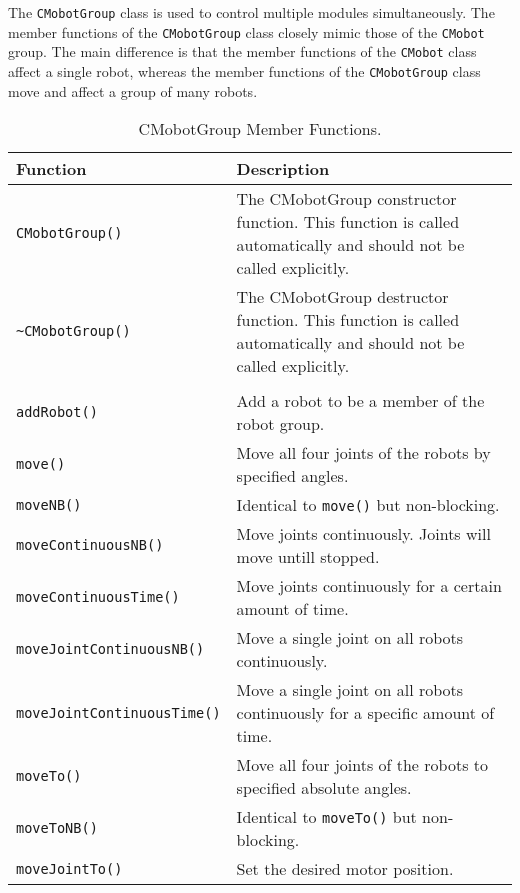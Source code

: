 The \texttt{CMobotGroup} class is used to control multiple modules simultaneously. The
member functions of the \texttt{CMobotGroup} class closely mimic those of the \texttt{CMobot}
group. The main difference is that the member functions of the \texttt{CMobot} class
affect a single robot, whereas the member functions of the \texttt{CMobotGroup} class
move and affect a group of many robots. 

\begin{table}[!h]
\begin{center}
\caption{CMobotGroup Member Functions.}
\begin{tabular}{p{38 mm}p{77 mm}}
\hline
Function & Description \\
\hline
\texttt{CMobotGroup()} & The CMobotGroup constructor function. This function
is called automatically and should not be called explicitly. \\
\texttt{\textasciitilde CMobotGroup()} & The CMobotGroup destructor function. This function
is called automatically and should not be called explicitly. \\
& \\
\texttt{addRobot()} & Add a robot to be a member of the robot group. \\
\texttt{move()} & Move all four joints of the robots by specified angles. \\
\texttt{moveNB()} & Identical to \texttt{move()} but non-blocking. \\
\texttt{moveContinuousNB()} & Move joints continuously. Joints will move untill stopped.\\
\texttt{moveContinuousTime()} & Move joints continuously for a certain amount of time.\\
\texttt{moveJointContinuousNB()} & Move a single joint on all robots continuously. \\
\texttt{moveJointContinuousTime()} & Move a single joint on all robots continuously for a specific amount of time. \\
\texttt{moveTo()} & Move all four joints of the robots to specified absolute angles. \\
\texttt{moveToNB()} & Identical to \texttt{moveTo()} but non-blocking. \\
\texttt{moveJointTo()} & Set the desired motor position. \\

\end{tabular}
\end{center}
\end{table}
